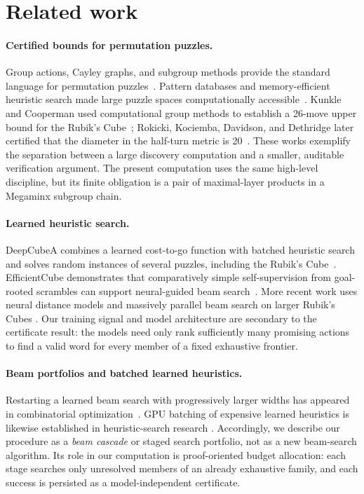 \section{Related work}
\label{sec:related-work}

\paragraph{Certified bounds for permutation puzzles.}
Group actions, Cayley graphs, and subgroup methods provide the standard
language for permutation puzzles~\cite{joyner2008}.  Pattern databases and
memory-efficient heuristic search made large puzzle spaces computationally
accessible~\cite{korf1997,culberson1998}.  Kunkle and Cooperman used
computational group methods to establish a 26-move upper bound for the Rubik's
Cube~\cite{kunkle2007}; Rokicki, Kociemba, Davidson, and Dethridge later
certified that the diameter in the half-turn metric is 20~\cite{rokicki2013}.
These works exemplify the separation between a large discovery computation
and a smaller, auditable verification argument.  The present computation uses
the same high-level discipline, but its finite obligation is a pair of
maximal-layer products in a Megaminx subgroup chain.

\paragraph{Learned heuristic search.}
DeepCubeA combines a learned cost-to-go function with batched heuristic search
and solves random instances of several puzzles, including the Rubik's
Cube~\cite{agostinelli2019}.  EfficientCube demonstrates that comparatively
simple self-supervision from goal-rooted scrambles can support neural-guided
beam search~\cite{takano2023}.  More recent work uses neural distance models
and massively parallel beam search on larger Rubik's Cubes
\cite{chervov2025}.  Our training signal and model architecture are secondary
to the certificate result: the models need only rank sufficiently many promising actions
to find a valid word for every member of a fixed exhaustive frontier.

\paragraph{Beam portfolios and batched learned heuristics.}
Restarting a learned beam search with progressively larger widths has appeared
in combinatorial optimization~\cite{cohenbeck2021}.  GPU batching of expensive
learned heuristics is likewise established in heuristic-search research
\cite{greco2022,futuhisturtevant2026}.  Accordingly, we describe our procedure
as a \emph{beam cascade} or staged search portfolio, not as a new beam-search
algorithm.  Its role in our computation is proof-oriented budget allocation: each
stage searches only unresolved members of an already exhaustive family, and
each success is persisted as a model-independent certificate.

